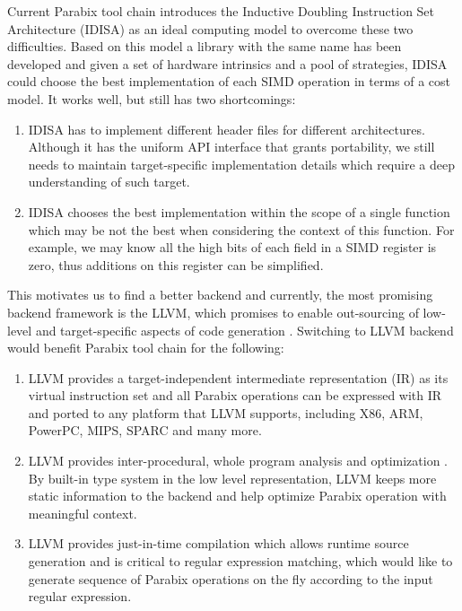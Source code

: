 Current Parabix tool chain introduces the Inductive Doubling Instruction Set Architecture (IDISA) as an ideal computing model to overcome these two difficulties. Based on this model a library with the same name has been developed and given a set of hardware intrinsics and a pool of strategies, IDISA could choose the best implementation of each SIMD operation in terms of a cost model. It works well, but still has two shortcomings:

\begin{enumerate}
  \item IDISA has to implement different header files for different architectures. Although it has the uniform API interface that grants portability, we still needs to maintain target-specific implementation details which require a deep understanding of such target.
  \item IDISA chooses the best implementation within the scope of a single function which may be not the best when considering the context of this function. For example, we may know all the high bits of each field in a SIMD register is zero, thus additions on this register can be simplified.
\end{enumerate}

This motivates us to find a better backend and currently, the most promising backend framework is the LLVM, which promises to enable out-sourcing of low-level and target-specific aspects of code generation \cite{llvm_ghc, chris_msthesis}. Switching to LLVM backend would benefit Parabix tool chain for the following:

\begin{enumerate}
  \item LLVM provides a target-independent intermediate representation (IR) as its virtual instruction set and all Parabix operations can be expressed with IR and ported to any platform that LLVM supports, including X86, ARM, PowerPC, MIPS, SPARC and many more.
  \item LLVM provides inter-procedural, whole program analysis and optimization \cite{llvm_cgo04}. By built-in type system in the low level representation, LLVM keeps more static information to the backend and help optimize Parabix operation with meaningful context.
  \item LLVM provides just-in-time compilation which allows runtime source generation and is critical to regular expression matching, which would like to generate sequence of Parabix operations on the fly according to the input regular expression.
\end{enumerate}

